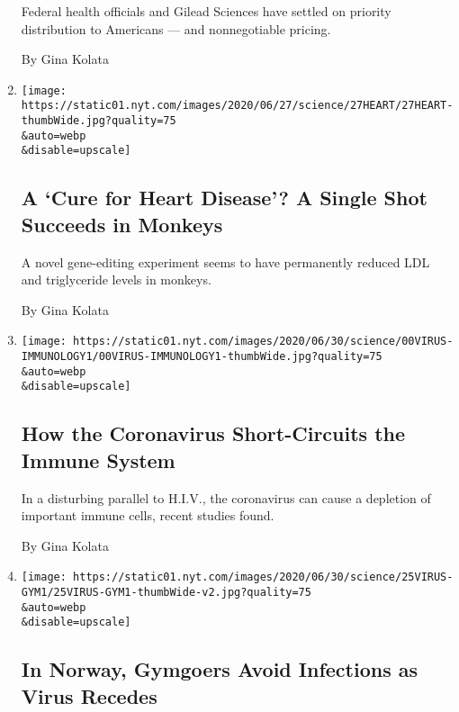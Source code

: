 \begin{enumerate}
  Federal health officials and Gilead Sciences have settled on priority
  distribution to Americans --- and nonnegotiable pricing.

  By Gina Kolata
\item
  \href{/2020/06/27/health/heart-disease-gene-editing.html}{}

  \texttt{[image: https://static01.nyt.com/images/2020/06/27/science/27HEART/27HEART-thumbWide.jpg?quality=75\\\&auto=webp\\\&disable=upscale]}

  \hypertarget{a-cure-for-heart-disease-a-single-shot-succeeds-in-monkeys}{%
  \subsection{A `Cure for Heart Disease'? A Single Shot Succeeds in
  Monkeys}\label{a-cure-for-heart-disease-a-single-shot-succeeds-in-monkeys}}

  A novel gene-editing experiment seems to have permanently reduced LDL
  and triglyceride levels in monkeys.

  By Gina Kolata
\item
  \href{/2020/06/26/health/coronavirus-immune-system.html}{}

  \texttt{[image: https://static01.nyt.com/images/2020/06/30/science/00VIRUS-IMMUNOLOGY1/00VIRUS-IMMUNOLOGY1-thumbWide.jpg?quality=75\\\&auto=webp\\\&disable=upscale]}

  \hypertarget{how-the-coronavirus-short-circuits-the-immune-system}{%
  \subsection{How the Coronavirus Short-Circuits the Immune
  System}\label{how-the-coronavirus-short-circuits-the-immune-system}}

  In a disturbing parallel to H.I.V., the coronavirus can cause a
  depletion of important immune cells, recent studies found.

  By Gina Kolata
\item
  \href{/2020/06/25/health/coronavirus-gyms-fitness.html}{}

  \texttt{[image: https://static01.nyt.com/images/2020/06/30/science/25VIRUS-GYM1/25VIRUS-GYM1-thumbWide-v2.jpg?quality=75\\\&auto=webp\\\&disable=upscale]}

  \hypertarget{in-norway-gymgoers-avoid-infections-as-virus-recedes}{%
  \subsection{In Norway, Gymgoers Avoid Infections as Virus
  Recedes}\label{in-norway-gymgoers-avoid-infections-as-virus-recedes}}


\end{enumerate}
